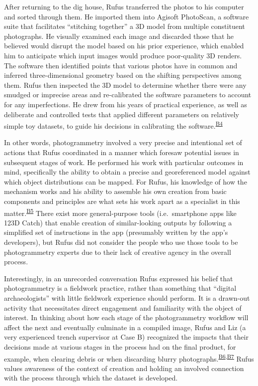 \documentclass[
]{article}
\begin{document}
After returning to the dig house, Rufus transferred the photos to his
computer and sorted through them. He imported them into Agisoft
PhotoScan, a software suite that facilitates ``stitching together'' a 3D
model from multiple constituent photographs. He visually examined each
image and discarded those that he believed would disrupt the model based
on his prior experience, which enabled him to anticipate which input
images would produce poor-quality 3D renders. The software then
identified points that various photos have in common and inferred
three-dimensional geometry based on the shifting perspectives among
them. Rufus then inspected the 3D model to determine whether there were
any smudged or imprecise areas and re-calibrated the software parameters
to account for any imperfections. He drew from his years of practical
experience, as well as deliberate and controlled tests that applied
different parameters on relatively simple toy datasets, to guide his
decisions in calibrating the
software.\textsuperscript{\hyperref[sec-B4]{B4}}

In other words, photogrammetry involved a very precise and intentional
set of actions that Rufus coordinated in a manner which foresaw
potential issues in subsequent stages of work. He performed his work
with particular outcomes in mind, specifically the ability to obtain a
precise and georeferenced model against which object distributions can
be mapped. For Rufus, his knowledge of how the mechanism works and his
ability to assemble his own creation from basic components and
principles are what sets his work apart as a specialist in this
matter.\textsuperscript{\hyperref[sec-B5]{B5}} There exist more
general-purpose tools (i.e.~smartphone apps like 123D Catch) that enable
creation of similar-looking outputs by following a simplified set of
instructions in the app (presumably written by the app's developers),
but Rufus did not consider the people who use those tools to be
photogrammetry experts due to their lack of creative agency in the
overall process.

Interestingly, in an unrecorded conversation Rufus expressed his belief
that photogrammetry is a fieldwork practice, rather than something that
``digital archaeologists'' with little fieldwork experience should
perform. It is a drawn-out activity that necessitates direct engagement
and familiarity with the object of interest. In thinking about how each
stage of the photogrammetry workflow will affect the next and eventually
culminate in a compiled image, Rufus and Liz (a very experienced trench
supervisor at Case B) recognized the impacts that their decisions made
at various stages in the process had on the final product, for example,
when clearing debris or when discarding blurry
photographs.\textsuperscript{\hyperref[sec-B6]{B6},\hyperref[sec-B7]{B7}}
Rufus values awareness of the context of creation and holding an
involved connection with the process through which the dataset is
developed.
\end{document}
